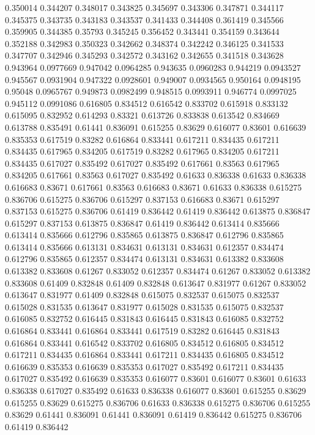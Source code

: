 0.350014 0.344207
0.348017 0.343825
0.345697 0.343306
0.347871 0.344117
0.345375 0.343735
0.343183 0.343537
0.341433 0.344408
0.361419 0.345566
0.359905 0.344385
0.35793 0.345245
0.356452 0.343441
0.354159 0.343644
0.352188 0.342983
0.350323 0.342662
0.348374 0.342242
0.346125 0.341533
0.347707 0.342946
0.345293 0.342572
0.343162 0.342655
0.341518 0.343628
0.943964 0.0977669
0.947042 0.0964285
0.943635 0.0960283
0.944219 0.0943527
0.945567 0.0931904
0.947322 0.0928601
0.949007 0.0934565
0.950164 0.0948195
0.95048 0.0965767
0.949873 0.0982499
0.948515 0.0993911
0.946774 0.0997025
0.945112 0.0991086
0.616805 0.834512
0.616542 0.833702
0.615918 0.833132
0.615095 0.832952
0.614293 0.83321
0.613726 0.833838
0.613542 0.834669
0.613788 0.835491
0.61441 0.836091
0.615255 0.83629
0.616077 0.83601
0.616639 0.835353
0.617519 0.83282
0.616864 0.833441
0.617211 0.834435
0.617211 0.834435
0.617965 0.834205
0.617519 0.83282
0.617965 0.834205
0.617211 0.834435
0.617027 0.835492
0.617027 0.835492
0.617661 0.83563
0.617965 0.834205
0.617661 0.83563
0.617027 0.835492
0.61633 0.836338
0.61633 0.836338
0.616683 0.83671
0.617661 0.83563
0.616683 0.83671
0.61633 0.836338
0.615275 0.836706
0.615275 0.836706
0.615297 0.837153
0.616683 0.83671
0.615297 0.837153
0.615275 0.836706
0.61419 0.836442
0.61419 0.836442
0.613875 0.836847
0.615297 0.837153
0.613875 0.836847
0.61419 0.836442
0.613414 0.835666
0.613414 0.835666
0.612796 0.835865
0.613875 0.836847
0.612796 0.835865
0.613414 0.835666
0.613131 0.834631
0.613131 0.834631
0.612357 0.834474
0.612796 0.835865
0.612357 0.834474
0.613131 0.834631
0.613382 0.833608
0.613382 0.833608
0.61267 0.833052
0.612357 0.834474
0.61267 0.833052
0.613382 0.833608
0.61409 0.832848
0.61409 0.832848
0.613647 0.831977
0.61267 0.833052
0.613647 0.831977
0.61409 0.832848
0.615075 0.832537
0.615075 0.832537
0.615028 0.831535
0.613647 0.831977
0.615028 0.831535
0.615075 0.832537
0.616085 0.832752
0.616445 0.831843
0.616445 0.831843
0.616085 0.832752
0.616864 0.833441
0.616864 0.833441
0.617519 0.83282
0.616445 0.831843
0.616864 0.833441
0.616542 0.833702
0.616805 0.834512
0.616805 0.834512
0.617211 0.834435
0.616864 0.833441
0.617211 0.834435
0.616805 0.834512
0.616639 0.835353
0.616639 0.835353
0.617027 0.835492
0.617211 0.834435
0.617027 0.835492
0.616639 0.835353
0.616077 0.83601
0.616077 0.83601
0.61633 0.836338
0.617027 0.835492
0.61633 0.836338
0.616077 0.83601
0.615255 0.83629
0.615255 0.83629
0.615275 0.836706
0.61633 0.836338
0.615275 0.836706
0.615255 0.83629
0.61441 0.836091
0.61441 0.836091
0.61419 0.836442
0.615275 0.836706
0.61419 0.836442
